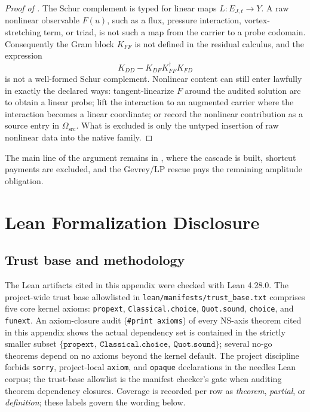 \documentclass[11pt]{article}
\newcommand{\Omsrc}{\Omega_{\mathrm{src}}}
\theoremstyle{definition}
\begin{document}
\begin{proof}[Proof of ]
The Schur complement is typed for linear maps \(L:E_{J,t}\to Y\).
A raw nonlinear observable \(F(u)\), such as a flux, pressure
interaction, vortex-stretching term, or triad, is not such a map from
the carrier to a probe codomain.  Consequently the Gram block
\(K_{FF}\) is not defined in the residual calculus, and the expression
\[
  K_{DD}-K_{DF}K_{FF}^{\dagger}K_{FD}
\]
is not a well-formed Schur complement.  Nonlinear content can still
enter lawfully in exactly the declared ways: tangent-linearize \(F\)
around the audited solution arc to obtain a linear probe; lift the
interaction to an augmented carrier where the interaction becomes a
linear coordinate; or record the nonlinear contribution as a source
entry in \(\Omsrc\).  What is excluded is only the untyped insertion of
raw nonlinear data into the native family.
\end{proof}

The main line of the argument remains in
, where the
cascade is built, shortcut payments are excluded, and the Gevrey/LP
rescue pays the remaining amplitude obligation.

 \section{Lean Formalization Disclosure}
\label{app:ns-formalization}

\subsection{Trust base and methodology}
\label{subsec:paper3-trust-methodology}

The Lean artifacts cited in this appendix were checked with Lean 4.28.0.
The project-wide trust base allowlisted in
\texttt{lean/manifests/trust\_base.txt} comprises five core kernel axioms:
\texttt{propext}, \texttt{Classical.choice}, \texttt{Quot.sound},
\texttt{choice}, and \texttt{funext}.  An axiom-closure audit
(\texttt{\#print axioms}) of every NS-axis theorem cited in this appendix
shows the actual dependency set is contained in the strictly smaller
subset $\{\texttt{propext},\ \texttt{Classical.choice},\ \texttt{Quot.sound}\}$;
several no-go theorems depend on no axioms beyond the kernel default.  The
project discipline forbids \texttt{sorry}, project-local \texttt{axiom}, and
\texttt{opaque} declarations in the needles Lean corpus; the trust-base
allowlist is the manifest checker's gate when auditing theorem dependency
closures.  Coverage is recorded per row as \emph{theorem}, \emph{partial},
or \emph{definition}; these labels govern the wording below.
\end{document}
